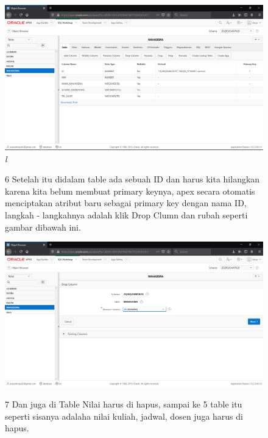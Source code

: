 \begin{enumerate}
\begin{figure}
    \begin{center}
\includegraphics[scale=0.2]{figures/14.png}
    \caption{\textit{{}l}}
        \end{center}
\label{gambar}
\end{figure}

\begin{figure}
\item[6]Setelah itu didalam table ada sebuah ID dan harus kita hilangkan karena kita belum membuat primary keynya, apex secara otomatis menciptakan atribut baru sebagai primary key dengan nama ID, langkah - langkahnya adalah klik Drop Clumn dan rubah seperti gambar dibawah ini. 

    \begin{center}
\includegraphics[scale=0.2]{figures/15.png}
    \caption{\textit{}}
        \end{center}
\label{gambar}
\end{figure}

\begin{figure}
\item[7]Dan juga di Table Nilai harus di hapus, sampai ke 5 table itu seperti sisanya adalaha nilai kuliah, jadwal, dosen juga harus di hapus.


\end{figure}
\end{enumerate}
